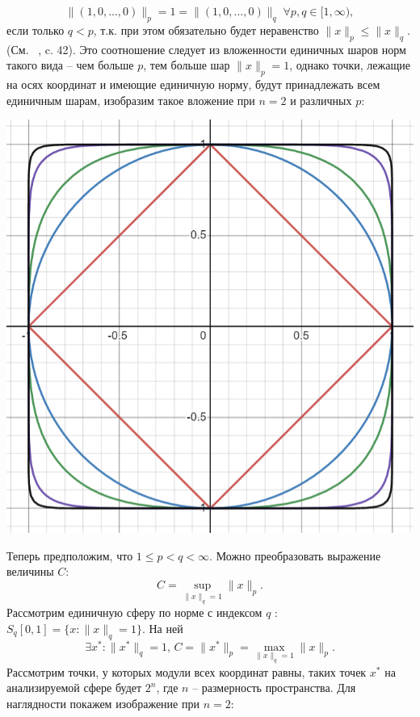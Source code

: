\documentclass{article}
\begin{document}
$$ \|(1,0,...,0)\|_p = 1 = \|(1,0,...,0)\|_q \; \forall p,q \in [1,\infty), $$ 
если только $q < p$, т.к. при этом обязательно будет неравенство $\|x\|_p \leq \|x\|_q$. (См. ~\cite{Zorich2}, c. 42). Это соотношение следует из вложенности единичных шаров норм такого вида -- чем больше $p$, тем больше шар $\|x\|_p = 1$, однако точки, лежащие на осях координат и имеющие единичную норму, будут принадлежать всем единичным шарам, изобразим такое вложение при $n=2$ и различных $p$:
\begin{center}
\includegraphics[scale=0.8]{pictures/p_spheres.png}
\end{center}
Теперь предположим, что $1 \leq p < q < \infty. $ Можно преобразовать выражение величины $C$:
$$ C = \sup\limits_{\|x\|_q=1}{\|x\|_p}. $$
Рассмотрим единичную сферу по норме с индексом $q$ : $ S_q[0,1] = \{x: \|x\|_q = 1\}.$ На ней
$$\exists x^*: \|x^*\|_q = 1, \, C = \|x^*\|_p = \max\limits_{\|x\|_q=1}{\|x\|_p}.$$
Рассмотрим точки, у которых модули всех координат равны, таких точек $x^*$ на анализируемой сфере будет $2^n$, где $n$ -- размерность пространства. Для наглядности покажем изображение при $n=2$:
\end{document}
